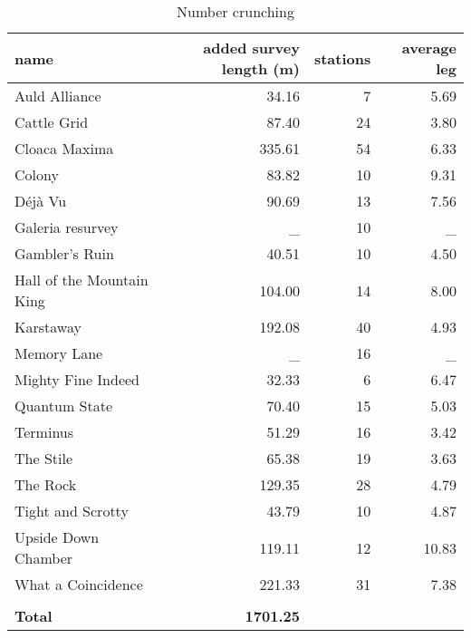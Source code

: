 \documentclass{article}
\begin{document}
   
 \begin{table}[htbp]
  \centering
  \caption{Number crunching}
    \begin{tabular}{@{}lrrr@{}} \toprule
    name  & added survey length (m) & stations & average leg \\ \midrule
    Auld Alliance & 34.16 & 7     & 5.69 \\
    Cattle Grid & 87.40 & 24    & 3.80 \\
    Cloaca Maxima & 335.61 & 54    & 6.33 \\
    Colony & 83.82 & 10    & 9.31 \\
    Déjà Vu & 90.69 & 13    & 7.56 \\
    Galeria resurvey & \_    & 10    & \_ \\
    Gambler's Ruin & 40.51 & 10    & 4.50 \\
    Hall of the Mountain King & 104.00 & 14    & 8.00 \\
    Karstaway & 192.08 & 40    & 4.93 \\
    Memory Lane & \_    & 16    & \_ \\
    Mighty Fine Indeed & 32.33 & 6     & 6.47 \\
    Quantum State & 70.40 & 15    & 5.03 \\
    Terminus & 51.29 & 16    & 3.42 \\
    The Stile & 65.38 & 19    & 3.63 \\
    The Rock & 129.35 & 28    & 4.79 \\
    Tight and Scrotty & 43.79 & 10    & 4.87 \\
    Upside Down Chamber & 119.11 & 12    & 10.83 \\
    What a Coincidence & 221.33 & 31    & 7.38 \\ \midrule
          &       &       &  \\ 
    \textbf{Total} & \textbf{1701.25} &       &  \\ \bottomrule
    \end{tabular}%
  \label{tab:addlabel}%
\end{table}%
\end{document}
